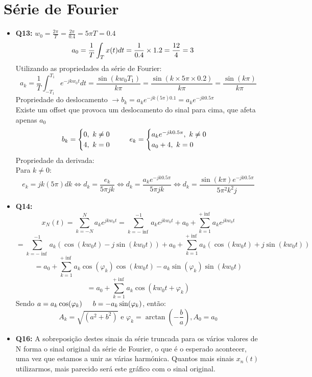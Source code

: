 \documentclass[a4paper, 12pt]{article}
\begin{document}
\section{Série de Fourier}
\begin{itemize}
    \item \textbf{Q13:} $w_0 = \frac{2\pi}{T} = \frac{2\pi}{0.4} = 5\pi$\hspace{50px}$T = 0.4$
          \[a_0 = \frac{1}{T}\int_{T}x(t)dt = \frac{1}{0.4} \times 1.2 = \frac{12}{4} = 3\hspace{15px} \vspace{10px}\]
          Utilizando as propriedades da série de Fourier:\vspace{10px}
          \[a_k = \frac{1}{T}\int_{-T_1}^{T_1}e^{-jkw_{0}t}dt = \frac{\sin(kw_{0}T_1)}{k\pi} = \frac{\sin(k \times 5\pi \times 0.2)}{k\pi} = \frac{\sin(k\pi)}{k\pi}\]
          Propriedade do deslocamento $\to b_k = a_{k}e^{-jk(5\pi)0.1} = a_{k}e^{-jk0.5\pi}$\\
          Existe um offset que provoca um deslocamento do sinal para cima, que afeta apenas $a_0$
          \[b_k =
              \begin{cases}
                  0, \textrm{ }k\neq0 \\
                  4, \textrm{ }k = 0
              \end{cases}
              \hspace{15px}
              e_k =
              \begin{cases}
                  a_{k}e^{-jk0.5\pi}, \textrm{ }k\neq0 \\
                  a_{0} + 4, \textrm{ }k = 0
              \end{cases}\]
          Propriedade da derivada:\vspace{10px}\\
          Para $k\neq0$:
          \[e_k = jk(5\pi)dk \Leftrightarrow d_k = \frac{e_k}{5\pi jk} \Leftrightarrow d_k = \frac{a_{k}e^{-jk0.5\pi}}{5\pi jk} \Leftrightarrow d_k = \frac{\sin(k\pi)e^{-jk0.5\pi}}{5\pi^{2}k^{2}j}\]
    \item \textbf{Q14:} \[x_N(t) = \sum_{k = -N}^{N} a_{k}e^{jkw_{0}t} = \sum_{k = -\inf}^{-1}a_{k}e^{jkw_{0}t} + a_{0} + \sum_{k=1}^{+\inf}a_{k}e^{jkw_{0}t}\]
          \[= \sum_{k = -\inf}^{-1}a_{k}(\cos(kw_{0}t) - j\sin(kw_{0}t)) + a_{0} + \sum_{k = 1}^{+\inf}a_{k}(\cos(kw_{0}t) + j\sin(kw_{0}t))\]
          \[= a_{0} + \sum_{k=1}^{+\inf}a_{k}\cos(\varphi_{k})\cos(kw_{0}t) - a_{k}\sin(\varphi_{k})\sin(kw_{0}t)\]
          \[= a_{0} + \sum_{k=1}^{+\inf}a_{k}\cos(kw_{0}t + \varphi_{k})\]
          Sendo $a = a_{k}\cos(\varphi_k)\hspace{15px}b=-a_k\sin(\varphi_{k})$, então:
          \[A_{k} = \sqrt{(a^{2}+b^{2})} \textrm{ e } \varphi_{k} = \arctan(-\frac{b}{a}), A_0 = a_0\]
    \item \textbf{Q16:} A sobreposição destes sinais da série truncada para os vários valores de N forma o sinal original da série de Fourier, o que é o esperado acontecer, uma vez que estamos a unir as várias harmónica. Quantos mais sinais $x_n(t)$ utilizarmos, mais parecido será este gráfico com o sinal original.
\end{itemize}
\newpage
\end{document}

